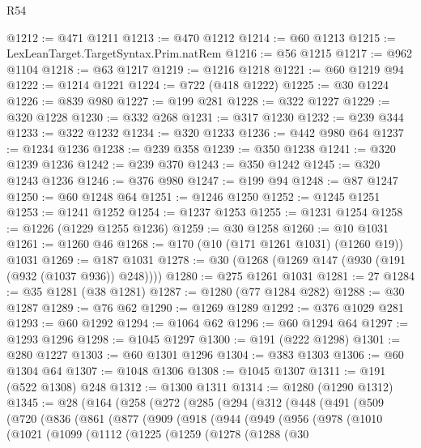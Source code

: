 \begin{lexlean}{R54}
\begin{coremodule}
{{{{{{{{{{{{{{{{{{{{{{{{{{{{{{{{{{{{{{{{{{{{{{{{{{@1212 := @471 @1211
@1213 := @470 @1212
@1214 := @60 @1213
@1215 := LexLeanTarget.TargetSyntax.Prim.natRem
@1216 := @56 @1215
@1217 := @962 @1104
@1218 := @63 @1217
@1219 := @1216 @1218
@1221 := @60 @1219 @94
@1222 := @1214 @1221
@1224 := @722 (@418 @1222)
@1225 := @30 @1224
@1226 := @839 @980
@1227 := @199 @281
@1228 := @322 @1227
@1229 := @320 @1228
@1230 := @332 @268
@1231 := @317 @1230
@1232 := @239 @344
@1233 := @322 @1232
@1234 := @320 @1233
@1236 := @442 @980 @64
@1237 := @1234 @1236
@1238 := @239 @358
@1239 := @350 @1238
@1241 := @320 @1239 @1236
@1242 := @239 @370
@1243 := @350 @1242
@1245 := @320 @1243 @1236
@1246 := @376 @980
@1247 := @199 @94
@1248 := @87 @1247
@1250 := @60 @1248 @64
@1251 := @1246 @1250
@1252 := @1245 @1251
@1253 := @1241 @1252
@1254 := @1237 @1253
@1255 := @1231 @1254
@1258 := @1226 (@1229 @1255 @1236)
@1259 := @30 @1258
@1260 := @10 @1031
@1261 := @1260 @46
@1268 := @170 (@10 (@171 @1261 @1031) (@1260 @19)) @1031
@1269 := @187 @1031
@1278 := @30 (@1268 (@1269 @147 (@930 (@191 (@932 (@1037 @936)) @248))))
@1280 := @275 @1261 @1031
@1281 := 27
@1284 := @35 @1281 (@38 @1281)
@1287 := @1280 (@77 @1284 @282)
@1288 := @30 @1287
@1289 := @76 @62
@1290 := @1269 @1289
@1292 := @376 @1029 @281
@1293 := @60 @1292
@1294 := @1064 @62
@1296 := @60 @1294 @64
@1297 := @1293 @1296
@1298 := @1045 @1297
@1300 := @191 (@222 @1298)
@1301 := @280 @1227
@1303 := @60 @1301 @1296
@1304 := @383 @1303
@1306 := @60 @1304 @64
@1307 := @1048 @1306
@1308 := @1045 @1307
@1311 := @191 (@522 @1308) @248
@1312 := @1300 @1311
@1314 := @1280 (@1290 @1312)
@1345 := @28
    (@164
      (@258
        (@272
          (@285
            (@294
              (@312
                (@448
                  (@491
                    (@509
                      (@720
                        (@836
                          (@861
                            (@877
                              (@909
                                (@918
                                  (@944
                                    (@949
                                      (@956
                                        (@978
                                          (@1010
                                            (@1021
                                              (@1099
                                                (@1112
                                                  (@1225
                                                    (@1259
                                                      (@1278
                                                        (@1288
                                                          (@30
}}}}}}}}}}}}}}}}}}}}}}}}}}}}}}}}}}}}}}}}}}}}}}}}}}
\end{coremodule}
\end{lexlean}
